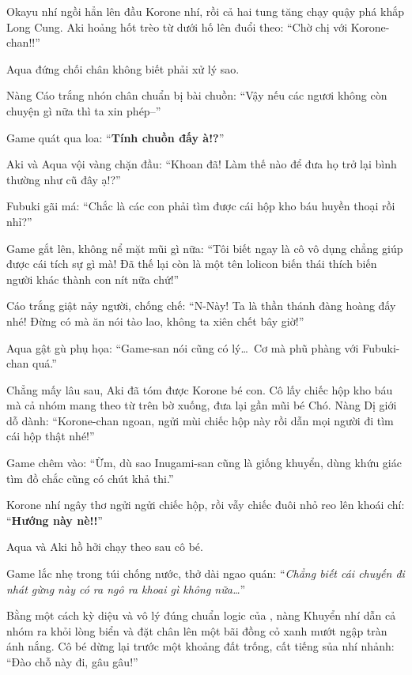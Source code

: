 \documentclass[../main.tex]{subfiles}
\begin{document}
Okayu nhí ngồi hẳn lên đầu Korone nhí, rồi cả hai tung tăng chạy quậy phá khắp Long Cung. Aki hoảng hốt trèo từ dưới hố lên đuổi theo: ``Chờ chị với Korone-chan!!''

Aqua đứng chối chân không biết phải xử lý sao.

Nàng Cáo trắng nhón chân chuẩn bị bài chuồn: ``Vậy nếu các ngươi không còn chuyện gì nữa thì ta xin phép--''

Game quát qua loa: ``\textbf{Tính chuồn đấy à!?}''

Aki và Aqua vội vàng chặn đầu: ``Khoan đã! Làm thế nào để đưa họ trở lại bình thường như cũ đây ạ!?''

Fubuki gãi má: ``Chắc là các con phải tìm được cái hộp kho báu huyền thoại rồi nhỉ?''

Game gắt lên, không nể mặt mũi gì nữa: ``Tôi biết ngay là cô vô dụng chẳng giúp được cái tích sự gì mà! Đã thế lại còn là một tên lolicon biến thái thích biến người khác thành con nít nữa chứ!''

Cáo trắng giật nảy người, chống chế: ``N-Này! Ta là thần thánh đàng hoàng đấy nhé! Đừng có mà ăn nói tào lao, không ta xiên chết bây giờ!''

Aqua gật gù phụ họa: ``Game-san nói cũng có lý\dots\ Cơ mà phũ phàng với Fubuki-chan quá.''

Chẳng mấy lâu sau, Aki đã tóm được Korone bé con. Cô lấy chiếc hộp kho báu mà cả nhóm mang theo từ trên bờ xuống, đưa lại gần mũi bé Chó. Nàng Dị giới dỗ dành: ``Korone-chan ngoan, ngửi mùi chiếc hộp này rồi dẫn mọi người đi tìm cái hộp thật nhé!''


Game chêm vào: ``Ừm, dù sao Inugami-san cũng là giống khuyển, dùng khứu giác tìm đồ chắc cũng có chút khả thi.''

Korone nhí ngây thơ ngửi ngửi chiếc hộp, rồi vẫy chiếc đuôi nhỏ reo lên khoái chí: ``\textbf{Hướng này nè!!}''

Aqua và Aki hồ hởi chạy theo sau cô bé.

Game lắc nhẹ trong túi chống nước, thở dài ngao quán: ``\textit{Chẳng biết cái chuyến đi nhát gừng này có ra ngô ra khoai gì không nữa\dots}''

\ct

Bằng một cách kỳ diệu và vô lý đúng chuẩn logic của \hll, nàng Khuyển nhí dẫn cả nhóm ra khỏi lòng biển và đặt chân lên một bãi đồng cỏ xanh mướt ngập tràn ánh nắng. Cô bé dừng lại trước một khoảng đất trống, cất tiếng sủa nhí nhảnh: ``Đào chỗ này đi, gâu gâu!''
\end{document}
